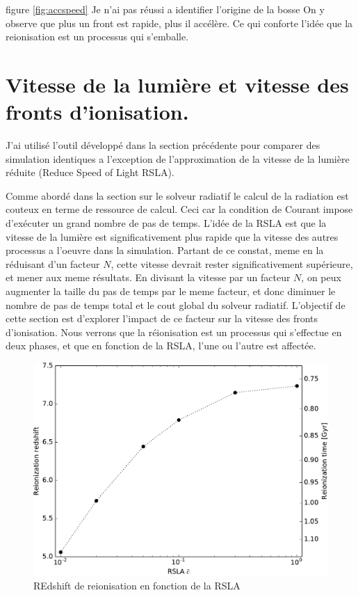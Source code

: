 figure \ref{fig:accspeed}
Je n'ai pas réussi a identifier l'origine de la bosse
On y observe que plus un front est rapide, plus il accélère.
Ce qui conforte l'idée que la reionisation est un processus qui s'emballe.




\chapter{Vitesse de la lumière et vitesse des fronts d'ionisation.}

J'ai utilisé l'outil développé dans la section précédente pour comparer des simulation identiques a l'exception de l'approximation de la vitesse de la lumière réduite (Reduce Speed of Light RSLA).

Comme abordé dans la section sur le solveur radiatif %
le calcul de la radiation est couteux en terme de ressource de calcul.
Ceci car la condition de Courant impose d'exécuter un grand nombre de pas de temps.
L'idée de la RSLA est que la vitesse de la lumière est significativement plus rapide que la vitesse des autres processus a l'oeuvre dans la simulation.
Partant de ce constat, meme en la réduisant d'un facteur $N$, cette vitesse devrait rester significativement supérieure, et mener aux meme résultats.
En divisant la vitesse par un facteur $N$, on peux augmenter la taille du pas de temps par le meme facteur, et donc diminuer le nombre de pas de temps total et le cout global du solveur radiatif.
L'objectif de cette section est d'explorer l'impact de ce facteur sur la vitesse des fronts d'ionisation.
Nous verrons que la réionisation est un processus qui s'effectue en deux phases, et que en fonction de la RSLA, l'une ou l'autre est affectée.



\begin{figure}[htpb]
        \includegraphics[width=.95\linewidth]{img/04_mapreio/z_rsla.pdf} 
        \caption{REdshift de reionisation en fonction de la RSLA
        }
 		\label{fig:zrsla}
\end{figure}

